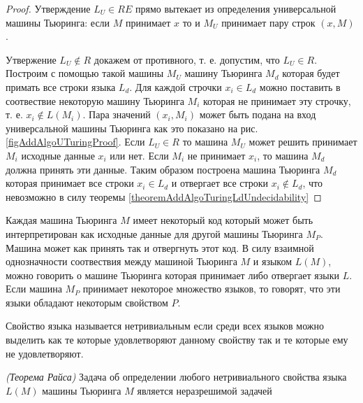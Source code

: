 \begin{proof}
Утверждение $L_U \in RE$ прямо вытекает из определения универсальной
машины Тьюринга: если $M$ принимает $x$ то и $M_U$ принимает пару
строк $\left(x, M\right)$.

Утвержение $L_U \notin R$ докажем от противного, т. е. допустим, что
$L_U \in R$. Построим с помощью такой машины $M_U$ машину Тьюринга
$M_d$ которая будет примать все строки языка $L_d$. Для каждой строчки
$x_i \in L_d$ можно поставить в соотвествие некоторую машину Тьюринга
$M_i$ которая не принимает эту строчку, т. е. $x_i \notin
L\left(M_i\right)$. Пара значений $\left(x_i, M_i\right)$ может быть
подана на вход универсальной машины Тьюринга как это показано на рис. 
\ref{figAddAlgoUTuringProof}. Если $L_U \in R$ то машина $M_U$ может
решить принимает $M_i$ исходные данные $x_i$ или нет. Если $M_i$ не
принимает $x_i$, то машина $M_d$ должна принять эти данные. Таким
образом построена машина Тьюринга $M_d$ которая принимает все строки
$x_i \in L_d$ и отвергает все строки $x_i \notin L_d$, что невозможно
в силу теоремы \ref{theoremAddAlgoTuringLdUndecidability}
\end{proof}

Каждая машина Тьюринга $M$ имеет некоторый код который может быть 
интерпретирован как исходные данные для другой машины Тьюринга $M_P$. 
Машина может как принять так и отвергнуть этот код. В силу взаимной
однозначности соотвествия между машиной Тьюринга $M$ и языком 
$L\left(M\right)$, можно говорить о машине Тьюринга
которая принимает либо отвергает языки $L$. Если машина $M_P$
принимает некоторое множество языков, то говорят, 
что эти языки обладают некоторым свойством $P$.

\begin{definition}
Свойство языка называется нетривиальным если среди всех языков можно
выделить как те которые удовлетворяют данному свойству так и те
которые ему не удовлетворяют.
\end{definition}

\begin{theorem}
\emph{(Теорема Райса)}
Задача об определении любого нетривиального свойства языка 
$L\left(M\right)$ машины Тьюринга $M$ является неразрешимой задачей
\end{theorem}

